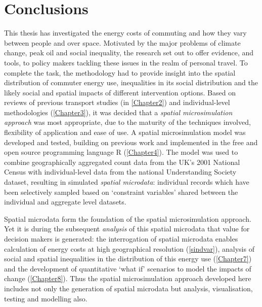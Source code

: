 
\chapter{Conclusions} %
\label{Chapter9}
\fancyhead[RE,LO]{\thepage}
This thesis has investigated the energy costs of commuting and how they vary
between people and over space.
Motivated by the major problems of climate change, peak oil and
social inequality, the research set out to offer
evidence, and tools, to policy makers tackling these issues in the realm
of personal travel.
To complete the task, the methodology had to provide insight into the
spatial distribution of commuter energy use,
inequalities in its social distribution and the likely social and spatial
impacts of different intervention options.
Based on reviews of previous transport studies (in \cref{Chapter2})
and individual-level methodologies (\cref{Chapter3}), it was decided that
a \emph{spatial microsimulation approach} was most appropriate,
due to the maturity of the techniques involved, flexibility of application and
ease of use.
A spatial microsimulation model was developed and tested, building on previous
work and implemented in the free and open source programming
language R (\cref{Chapter4}). The model
was used to combine geographically aggregated count data from the UK's 2001 National Census
with individual-level data from the national Understanding Society dataset,
resulting in simulated \emph{spatial microdata}: individual
records which have been selectively sampled based on `constraint variables' shared
between the individual and aggregate level datasets.

Spatial microdata form the foundation of the spatial microsimulation approach.
Yet it is during the subsequent \emph{analysis} of this spatial microdata that
value for decision makers is generated: the interrogation of spatial microdata enables
calculation of energy costs at high geographical resolution (\cref{sindvar}),
analysis of social and spatial inequalities in the distribution of this energy
use (\cref{Chapter7}) and the development of quantitative
`what if' scenarios to model the impacts of change (\cref{Chapter8}).
Thus the spatial microsimulation approach developed here
includes not only the generation of spatial microdata but
analysis, visualisation, testing and modelling also.

